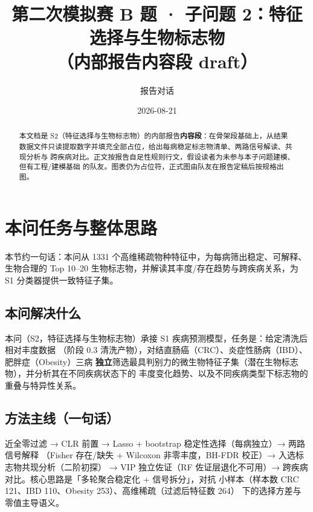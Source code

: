 \documentclass{internal-report}
\title{第二次模拟赛 B 题 · 子问题 2：特征选择与生物标志物\\（内部报告内容段 draft）}
\author{报告对话}
\date{2026-08-21}
\begin{document}
\maketitle

\begin{abstract}
本文档是 S2（特征选择与生物标志物）的内部报告\textbf{内容段}：在骨架段基础上，从结果
数据文件只读提取数字并填充全部占位，给出每病稳定标志物清单、两路信号解读、共现分析与
跨疾病对比。正文按报告自足性规则行文，假设读者为未参与本子问题建模、但有工程/建模基础
的队友。图表仍为占位符，正式图由队友在报告定稿后按规格出图。
\end{abstract}

\section{本问任务与整体思路}
本节约一句话：本问从 1331 个高维稀疏物种特征中，为每病筛出稳定、可解释、生物合理的
Top 10--20 生物标志物，并解读其丰度/存在趋势与跨疾病关系，为 S1 分类器提供一致特征子集。

\subsection{本问解决什么}
本问（S2，特征选择与生物标志物）承接 S1 疾病预测模型，任务是：给定清洗后相对丰度数据
（阶段 0.3 清洗产物），对结直肠癌（CRC）、炎症性肠病（IBD）、肥胖症（Obesity）三病
\textbf{独立}筛选最具判别力的微生物特征子集（潜在生物标志物），并分析其在不同疾病状态下的
丰度变化趋势、以及不同疾病类型下标志物的重叠与特异性关系。

\subsection{方法主线（一句话）}
近全零过滤 → CLR 前置 → Lasso + bootstrap 稳定性选择（每病独立）→ 两路信号解释
（Fisher 存在/缺失 + Wilcoxon 非零丰度，BH-FDR 校正）→ 入选标志物共现分析（二阶初探）
→ VIP 独立佐证（RF 佐证层退化不可用）→ 跨疾病对比。核心思路是「多轮聚合稳定化 + 信号拆分」，对抗
小样本（样本数 CRC 121、IBD 110、Obesity 253）、高维稀疏（过滤后特征数 264）
下的选择方差与零值主导语义。
\end{document}
